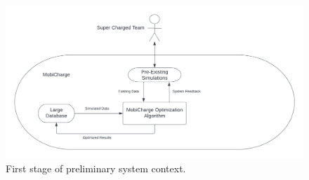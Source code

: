 \documentclass[12pt, titlepage]{article}
\begin{document}
\begin{figure}[htp]
    \centering
    \includegraphics[width=15cm]{images/context0.png}
    \caption[Prelim System Contexts 1]{First stage of preliminary system context.}
    \label{fig:figure1}
\end{figure}
\end{document}
